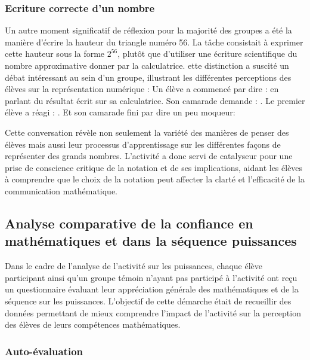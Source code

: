 \subsubsection{Ecriture correcte d'un nombre}

Un autre moment significatif de réflexion pour la majorité des groupes a été la manière d'écrire la hauteur du triangle numéro 56.
La tâche consistait à exprimer cette hauteur sous la forme $2^{56}$,
plutôt que d'utiliser une écriture scientifique du nombre approximative donner par la calculatrice.
ette distinction a suscité un débat intéressant au sein d'un groupe,
illustrant les différentes perceptions des élèves sur la représentation numérique :
Un élève a commencé par dire :  en parlant du résultat écrit sur sa calculatrice.
Son camarade demande : .
Le premier élève a réagi : .
Et son camarade fini par dire un peu moqueur: 


Cette conversation révèle non seulement la variété des manières de penser des élèves mais aussi leur processus d'apprentissage sur les différentes façons de représenter des grands nombres.
L'activité a donc servi de catalyseur pour une prise de conscience critique de la notation et de ses implications,
aidant les élèves à comprendre que le choix de la notation peut affecter la clarté et l'efficacité de la communication mathématique.

\subsection{Analyse comparative de la confiance en mathématiques et dans la séquence puissances}

Dans le cadre de l'analyse de l'activité sur les puissances,
chaque élève participant ainsi qu'un groupe témoin n'ayant pas participé à l'activité ont reçu un questionnaire évaluant leur appréciation générale des mathématiques et de la séquence sur les puissances.
L'objectif de cette démarche était de recueillir des données permettant de mieux comprendre l'impact de l'activité sur la perception des élèves de leurs compétences mathématiques.\\

\subsubsection{Auto-évaluation}

